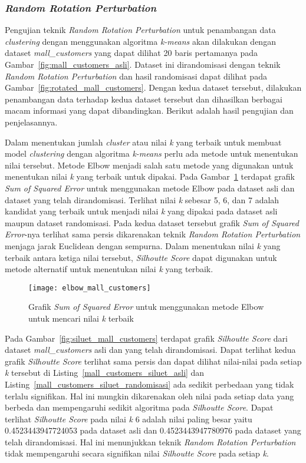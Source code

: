 \subsubsection{\textit{Random Rotation Perturbation}}
\label{subsubsec:pengujian-clustering-rrp}

Pengujian teknik \textit{Random Rotation Perturbation} untuk penambangan data \textit{clustering} dengan menggunakan algoritma \textit{k-means} akan dilakukan dengan dataset \textit{mall\_customers} yang dapat dilihat 20 baris pertamanya pada Gambar~\ref{fig:mall_customers_asli}. Dataset ini dirandomisasi dengan teknik \textit{Random Rotation Perturbation} dan hasil randomisasi dapat dilihat pada Gambar~\ref{fig:rotated_mall_customers}. Dengan kedua dataset tersebut, dilakukan penambangan data terhadap kedua dataset tersebut dan dihasilkan berbagai macam informasi yang dapat dibandingkan. Berikut adalah hasil pengujian dan penjelasannya.

Dalam menentukan jumlah \textit{cluster} atau nilai \textit{k} yang terbaik untuk membuat model \textit{clustering} dengan algoritma \textit{k-means} perlu ada metode untuk menentukan nilai tersebut. Metode Elbow menjadi salah satu metode yang digunakan untuk  menentukan nilai \textit{k} yang terbaik untuk dipakai. Pada Gambar~\ref{fig:elbow_mall_customers} terdapat grafik \textit{Sum of Squared Error} untuk menggunakan metode Elbow pada dataset asli dan dataset yang telah dirandomisasi. Terlihat nilai \textit{k} sebesar 5, 6, dan 7 adalah kandidat yang terbaik untuk menjadi nilai \textit{k} yang dipakai pada dataset asli maupun dataset randomisasi. Pada kedua dataset tersebut grafik \textit{Sum of Squared Error}-nya terlihat sama persis dikarenakan teknik \textit{Random Rotation Perturbation} menjaga jarak Euclidean dengan sempurna. Dalam menentukan nilai \textit{k} yang terbaik antara ketiga nilai tersebut, \textit{Silhoutte Score} dapat digunakan untuk metode alternatif untuk menentukan nilai \textit{k} yang terbaik.

\begin{figure}
	\centering
	\texttt{[image: elbow\_mall\_customers]}
	\caption{Grafik \textit{Sum of Squared Error} untuk menggunakan metode Elbow untuk mencari nilai \textit{k} terbaik}
	\label{fig:elbow_mall_customers}
\end{figure}

Pada Gambar~\ref{fig:siluet_mall_customers} terdapat grafik \textit{Silhoutte Score} dari dataset \textit{mall\_customers} asli dan yang telah dirandomisasi. Dapat terlihat kedua grafik \textit{Silhoutte Score} terlihat sama persis dan dapat dilihat nilai-nilai pada setiap \textit{k} tersebut di Listing~\ref{mall_customers_siluet_asli} dan Listing~\ref{mall_customers_siluet_randomisasi} ada sedikit perbedaan yang tidak terlalu signifikan. Hal ini mungkin dikarenakan oleh nilai pada setiap data yang berbeda dan mempengaruhi sedikit algoritma pada \textit{Silhoutte Score}. Dapat terlihat \textit{Silhoutte Score} pada nilai \textit{k} 6 adalah nilai paling besar yaitu 0.4523443947724053 pada dataset asli dan 0.4523443947780976 pada dataset yang telah dirandomisasi. Hal ini menunjukkan teknik \textit{Random Rotation Perturbation} tidak mempengaruhi secara signifikan nilai \textit{Silhoutte Score} pada setiap \textit{k}.

